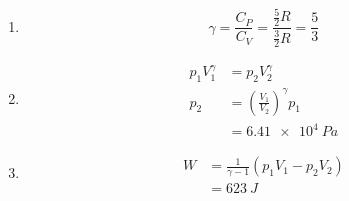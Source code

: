 \documentclass{article}
\begin{document}
\subsubsection{}

\begin{enumerate}
  \item \[\gamma = \frac{C_P}{C_V} = \frac{\frac{5}{2} R}{\frac{3}{2} R} = \frac{5}{3}\]

  \item

        \begin{align*}
          p_1 V_1^\gamma & = p_2 V_2^\gamma                            \\
          p_2            & = \left( \frac{V_1}{V_2} \right)^\gamma p_1 \\
                         & = \qty{6.41e4}{Pa}
        \end{align*}

  \item

        \begin{align*}
          W & = \frac{1}{\gamma - 1} (p_1 V_1 - p_2 V_2) \\
            & = \qty{623}{J}
        \end{align*}
\end{enumerate}

\subsubsection{}
\end{document}
